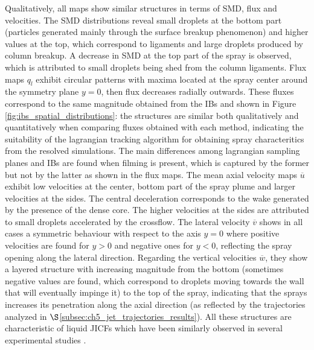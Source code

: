 Qualitatively, all maps show similar structures in terms of SMD, flux and velocities. The SMD distributions reveal small droplets at the bottom part (particles generated mainly through the surface breakup phenomenon) and higher values at the top, which correspond to ligaments and large droplets produced by column breakup. A decrease in SMD at the top part of the spray is observed, which is attributed to small droplets being shed from the column ligaments. Flux maps $q_l$ exhibit circular patterns with maxima located at the spray center around the symmetry plane $y = 0$, then flux decreases radially outwards. These fluxes correspond to the same magnitude obtained from the IBs and shown in Figure \ref{fig:ibs_spatial_distributions}: the structures are similar both qualitatively and quantitatively when comparing fluxes obtained with each method, indicating the suitability of the lagrangian tracking algorithm for obtaining spray characteritics from the resolved simulations. The main differences among lagrangian sampling planes and IBs are found when filming is present, which is captured by the former but not by the latter as shown in the flux maps. The mean axial velocity maps $\overline{u}$ exhibit low velocities at the center, bottom part of the spray plume and larger velocities at the sides. The central deceleration corresponds to the wake generated by the presence of the dense core. The higher velocities at the sides are attributed to small droplets accelerated by the crossflow. The lateral velocity $\overline{v}$ shows in all cases a symmetric behaviour with respect to the axis $y = 0$ where positive velocities are found for $y > 0$ and negative ones for $y < 0$, reflecting the spray opening along the lateral direction. Regarding the vertical velocities $\overline{w}$, they show a layered structure with increasing magnitude from the bottom (sometimes negative values are found, which correspond to droplets moving towards the wall that will eventually impinge it) to the top of the spray, indicating that the sprays increases its penetration along the axial direction (as reflected by the trajectories analyzed in $\S$\ref{subsec:ch5_jet_trajectories_results}). All these structures are characteristic of liquid JICFs which have been similarly observed in several experimental studies .

